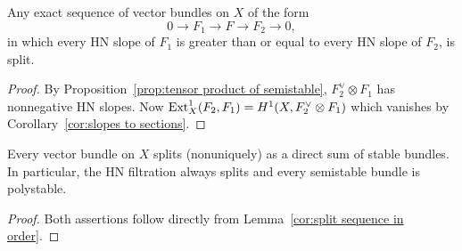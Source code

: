 \begin{lemma} \label{cor:split sequence in order}
Any exact sequence of vector bundles on $X$ of the form
\[
0 \to F_1 \to F \to F_2 \to 0,
\]
in which every HN slope of $F_1$ is greater than or equal to every HN slope of $F_2$, is split.
\end{lemma}
\begin{proof}
\label{uses:prop:tensor product of semistable,cor:slopes to sections}
By Proposition~\ref{prop:tensor product of semistable}, $F_2^\vee \otimes F_1$ has nonnegative HN slopes.
Now $\operatorname{Ext}^1_X(F_2, F_1) = H^1(X, F_2^\vee \otimes F_1)$ which vanishes by Corollary~\ref{cor:slopes to sections}.
\end{proof}

\begin{proposition} \label{prop:decompose as stables}
Every vector bundle on $X$ splits (nonuniquely) as a direct sum of stable bundles. In particular, the HN filtration always splits and every semistable bundle is polystable.
\end{proposition}
\begin{proof}
Both assertions follow directly from Lemma~\ref{cor:split sequence in order}.
\end{proof}

